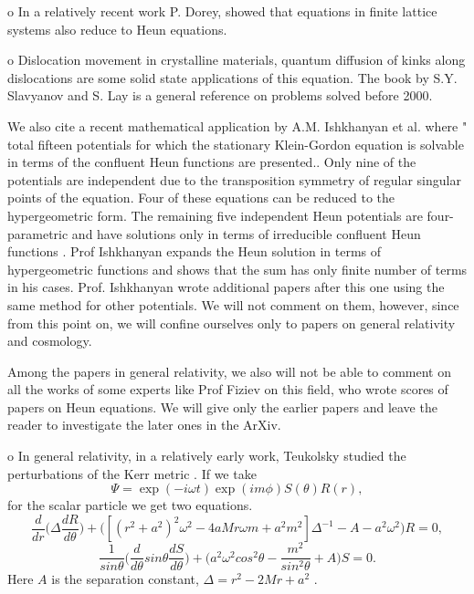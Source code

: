 \documentclass{article}
\begin{document}
o In a relatively recent work P. Dorey, 
\cite{Dorey} showed that equations in finite lattice systems also
reduce to Heun equations.

o Dislocation movement in crystalline materials, quantum diffusion
of kinks along dislocations are some solid state applications of
this equation. The book by S.Y. Slavyanov and S. Lay
\cite{Slavyanov} is a general reference on problems solved before
2000.


\noindent

We also cite a  recent mathematical application by A.M.
Ishkhanyan et al. where " total fifteen potentials for which the
stationary Klein-Gordon equation is solvable in terms of the
confluent Heun functions are presented.. Only nine of the
potentials are independent due to the  transposition symmetry of
regular singular points of  the equation. Four of these equations
can be reduced to the hypergeometric form. The remaining five
independent Heun potentials are four-parametric and have solutions
only in terms of irreducible confluent Heun functions \cite
{Artur13}. Prof Ishkhanyan expands the Heun solution in terms of hypergeometric functions
 and shows that the sum has only finite number of terms in his cases.
Prof. Ishkhanyan wrote additional papers after this
 one using the same method for other potentials. We will not comment on them,
 however, since from this point on, we will confine ourselves only to  papers on
 general relativity and cosmology.



\noindent


Among the papers in general relativity, we also will not be able
to comment on all the works of some experts like Prof Fiziev on this field, who wrote scores
 of papers on Heun equations. We will give only the earlier papers and leave
the reader to investigate the later ones in the ArXiv.



\noindent

o In general relativity, in a relatively early work, Teukolsky
studied the perturbations of the Kerr metric \cite {Teukolsky}. If
we take $$ \Psi = \exp(-i\omega t) \exp ( im\phi ) S(\theta) R(r),
$$
for the scalar particle we get two equations.
\begin {equation}
\frac {d}{dr} \Big( \Delta \frac {dR}{d\theta} \Big) + \Big( [
(r^2+a^2)^2 \omega^2 -4aMr\omega m +a^2 m^2 ] \Delta^{-1} -A- a^2
\omega^2 \Big) R=0,
\end{equation}
\begin {equation} \frac {1}{ sin {\theta}} \Big( \frac {d} {d
\theta} sin{\theta} \frac {dS} { d\theta} \Big)  + \Big(
a^2\omega^2 cos^2{\theta} - \frac{ m^2}{ sin^2 {\theta}} +A \Big)
S =0.
\end {equation}
Here $A$ is the separation constant, $ \Delta = r^2 -2Mr +a^2 $ .
\end{document}
